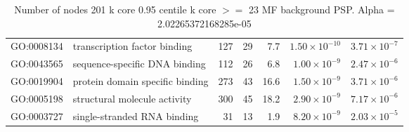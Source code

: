 \begin{table}[ht]
\begin{adjustbox}{width=\textwidth}
\begin{tabular}{llrrrrr}
  GO:0008134 & transcription factor binding & 127 & 29 & 7.7 & $1.50 \times 10^{-10}$ & $3.71 \times 10^{-7}$ \\ 
  GO:0043565 & sequence-specific DNA binding & 112 & 26 & 6.8 & $1.00 \times 10^{-9}$ & $2.47 \times 10^{-6}$ \\ 
  GO:0019904 & protein domain specific binding & 273 & 43 & 16.6 & $1.50 \times 10^{-9}$ & $3.71 \times 10^{-6}$ \\ 
  GO:0005198 & structural molecule activity & 300 & 45 & 18.2 & $2.90 \times 10^{-9}$ & $7.17 \times 10^{-6}$ \\ 
  GO:0003727 & single-stranded RNA binding & 31 & 13 & 1.9 & $8.20 \times 10^{-9}$ & $2.03 \times 10^{-5}$ \\ 
   \hline
\end{tabular}
\end{adjustbox}
\caption{Number of nodes 201 k core 0.95 centile  k core $>=$ 23 MF background PSP. Alpha = 2.02265372168285e-05} 
\label{tab:Number of nodes 201 k core 0.95 centile  k core $>=$ 23 MF background PSP. Alpha = 2.02265372168285e-05}
\end{table}


